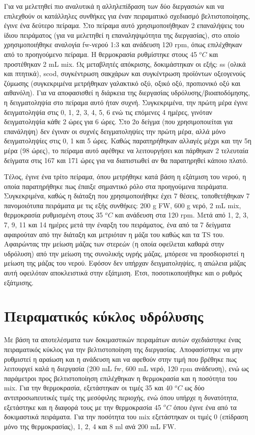 \documentclass[11pt]{report}
\begin{document}
Για να μελετηθεί πιο αναλυτικά η αλληλεπίδραση των δύο διεργασιών και να επιλεχθούν οι κατάλληλες συνθήκες για έναν πειραματικό σχεδιασμό βελτιστοποίησης, έγινε ένα δεύτερο πείραμα. Στο πείραμα αυτό χρησιμοποιήθηκαν 2 επαναλήψεις του ίδιου πειράματος (για να μελετηθεί η επαναληψιμότητα της διεργασίας), στο οποίο χρησιμοποιήθηκε αναλογία \acrshort{fw}-νερού 1:3 και ανάδευση 120 rpm, όπως επιλέχθηκαν από το προηγούμενο πείραμα. Η θερμοκρασία ρυθμίστηκε στους 45 \(^oC\) και προστέθηκαν 2 mL \acrshort{mix}. Ως μεταβλητές απόκρισης, δοκιμάστηκαν οι εξής: \acrshort{ss} (ολικά και πτητικά), \acrshort{scod}, συγκέντρωση σακχάρων και συγκέντρωση προϊόντων οξεογενούς ζύμωσης (συγκεκριμένα μετρήθηκαν γαλακτικό οξύ, οξικό οξύ, προπιονικό οξύ και αιθανόλη). Για να αποφασισθεί η διάρκεια της διεργασίας υδρόλυσης/βιοαποδόμησης, η δειγματοληψία στο πείραμα αυτό ήταν συχνή. Συγκεκριμένα, την πρώτη μέρα έγινε δειγματοληψία στις 0, 1, 2, 3, 4, 5, 6 ενώ τις επόμενες 4 ημέρες, γινόταν δειγματοληψία κάθε 2 ώρες για 6 ώρες. Στο 2ο δείγμα (που χρησιμοποιείται για επανάληψη) δεν έγιναν οι συχνές δειγματοληψίες την πρώτη μέρα, αλλά μόνο δειγματοληψίες στις 0, 1 και 5 ώρες. Καθώς παρατηρήθηκαν αλλαγές μέχρι και την 5η μέρα (98 ώρες), το πείραμα αυτό αφέθηκε να λειτουργήσει και πάρθηκαν 2 τελευταία δείγματα στις 167 και 171 ώρες για να διαπιστωθεί αν θα παρατηρηθεί κάποιο πλατό.

Τέλος, έγινε ένα τρίτο πείραμα, όπου μετρήθηκε κατά βάση η εξάτμιση του νερού, η οποία παρατηρήθηκε πως έπαιξε σημαντικό ρόλο στα προηγούμενα πειράματα. Συγκεκριμένα, καθώς η διάταξη που χρησιμοποιήθηκε έχει 7 θέσεις, τοποθετήθηκαν 7 πανομοιότυπα πειράματα με τις εξής συνθήκες: 200 g FW, 600 g νερό, 2 mL \acrshort{mix}, θερμοκρασία ρυθμισμένη στους 35 \(^oC\) και ανάδευση στα 120 rpm. Μετά από 1, 2, 3, 7, 9, 11 και 14 ημέρες μετά την έναρξη του πειράματος, ένα από τα 7 δείγματα αφαιρούταν από την διάταξη και μετριόταν η μάζα του καθώς και τα TS του. Αφαιρώντας την μείωση μάζας των στερεών (η οποία οφείλεται καθαρά στην υδρόλυση) από την μείωση της συνολικής υγρής μάζας, μπόρεσε να προσδιοριστεί η μείωση της μάζας του νερού. Εφόσον δεν υπήρχαν δειγματοληψίες, η απώλεια μάζας αυτή οφειλόταν αποκλειστικά στην εξάτμιση. Έτσι, ποσοτικοποιήθηκε και ο ρυθμός εξάτμισης.

\section{Πειραματικός κύκλος υδρόλυσης}
\label{sec:org3174607}
Με βάση τα αποτελέσματα των δοκιμαστικών πειραμάτων αυτών σχεδιάστηκε ένας πειραματικός κύκλος για την βελτιστοποίηση της διεργασίας. Αποφασίστηκε να μην ρυθμιστεί η αραίωση και η ανάδευση και να αφεθούν στην τιμή που βρέθηκε πως λειτουργεί καλά η διεργασία (200 mL \acrshort{fw}, 600 mL νερό, 120 rpm ανάδευση), ενώ ως παράμετροι προς βελτιστοποίηση επιλέχθηκαν η θερμοκρασία και η ποσότητα του \acrshort{mix}. Για την θερμοκρασία, εξετάστηκαν οι τιμές 35 και 40 \(^oC\) ως δύο αντιπροσωπευτικές τιμές της μεσόφιλης περιοχής, ενώ όπου υπήρχε η δυνατότητα, εξετάστηκε και η διαφορά τους με την θερμοκρασία 45 \(^oC\) όπου έγινε ένα από τα δοκιμαστικά πειράματα. Για την ποσότητα του \acrshort{mix} εξετάστηκαν οι τιμές 0 (επίδραση μόνο της θερμοκρασίας), 1, 2, 4 και 8 ml ανά 200 mL FW. 
\end{document}
